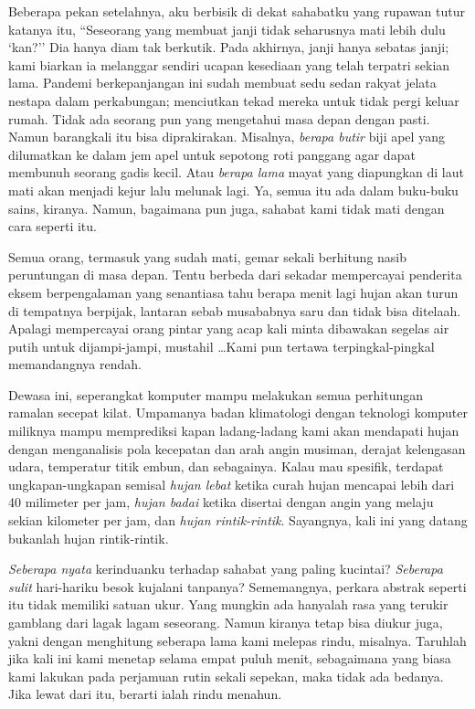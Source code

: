 \documentclass[smalldemyvopaper,11pt,twoside,onecolumn,openright,extrafontsizes]{memoir}
\begin{document}

Beberapa pekan setelahnya, aku berbisik di dekat sahabatku yang rupawan tutur katanya itu, ``Seseorang yang membuat janji tidak seharusnya mati lebih dulu `kan?'' Dia hanya diam tak berkutik. Pada akhirnya, janji hanya sebatas janji; kami biarkan ia melanggar sendiri ucapan kesediaan yang telah terpatri sekian lama. Pandemi berkepanjangan ini sudah membuat sedu sedan rakyat jelata nestapa dalam perkabungan; menciutkan tekad mereka untuk tidak pergi keluar rumah. Tidak ada seorang pun yang mengetahui masa depan dengan pasti. Namun barangkali itu bisa diprakirakan. Misalnya, \textit{berapa butir} biji apel yang dilumatkan ke dalam jem apel untuk sepotong roti panggang agar dapat membunuh seorang gadis kecil. Atau \textit{berapa lama} mayat yang diapungkan di laut mati akan menjadi kejur lalu melunak lagi. Ya, semua itu ada dalam buku-buku sains, kiranya. Namun, bagaimana pun juga, sahabat kami tidak mati dengan cara seperti itu.


Semua orang, termasuk yang sudah mati, gemar sekali berhitung nasib peruntungan di masa depan. Tentu berbeda dari sekadar mempercayai penderita eksem berpengalaman yang senantiasa tahu berapa menit lagi hujan akan turun di tempatnya berpijak, lantaran sebab musababnya saru dan tidak bisa ditelaah. Apalagi mempercayai orang pintar yang acap kali minta dibawakan segelas air putih untuk dijampi-jampi, mustahil \dots Kami pun tertawa terpingkal-pingkal memandangnya rendah.


Dewasa ini, seperangkat komputer mampu melakukan semua perhitungan ramalan secepat kilat. Umpamanya badan klimatologi dengan teknologi komputer miliknya mampu memprediksi kapan ladang-ladang kami akan mendapati hujan dengan menganalisis pola kecepatan dan arah angin musiman, derajat kelengasan udara, temperatur titik embun, dan sebagainya. Kalau mau spesifik, terdapat ungkapan-ungkapan semisal \textit{hujan lebat} ketika curah hujan mencapai lebih dari 40 milimeter per jam, \textit{hujan badai} ketika disertai dengan angin yang melaju sekian kilometer per jam, dan \textit{hujan rintik-rintik}. Sayangnya, kali ini yang datang bukanlah hujan rintik-rintik.


\textit{Seberapa nyata} kerinduanku terhadap sahabat yang paling kucintai? \textit{Seberapa sulit} hari-hariku besok kujalani tanpanya? Sememangnya, perkara abstrak seperti itu tidak memiliki satuan ukur. Yang mungkin ada hanyalah rasa yang terukir gamblang dari lagak lagam seseorang. Namun kiranya tetap bisa diukur juga, yakni dengan menghitung seberapa lama kami melepas rindu, misalnya. Taruhlah jika kali ini kami menetap selama empat puluh menit, sebagaimana yang biasa kami lakukan pada perjamuan rutin sekali sepekan, maka tidak ada bedanya. Jika lewat dari itu, berarti ialah rindu menahun.
\end{document}
